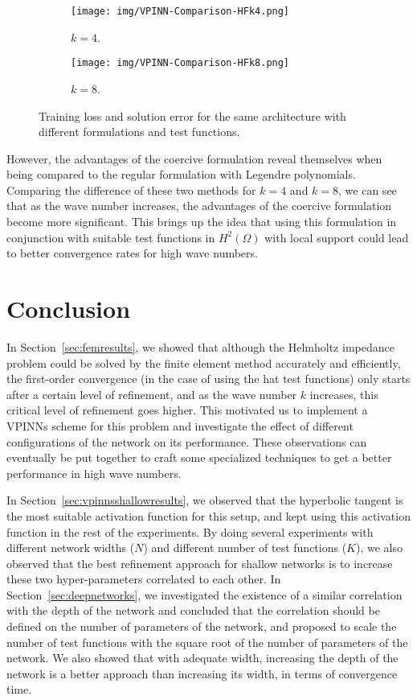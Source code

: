 \begin{figure}[h!]
    \centering
    \begin{subfigure}[b]{0.48\textwidth}
        \texttt{[image: img/VPINN-Comparison-HFk4.png]}
        \caption{$k=4$.}
        \label{fig:coercivek4}
    \end{subfigure}
    \hfill
    \begin{subfigure}[b]{0.48\textwidth}
        \texttt{[image: img/VPINN-Comparison-HFk8.png]}
        \caption{$k=8$.}
        \label{fig:coercivek8}
    \end{subfigure}
    \caption{Training loss and solution error for the same architecture with different formulations and test functions.}
    \label{fig:coercive}
\end{figure}

However, the advantages of the coercive formulation reveal themselves when being compared to the regular formulation with Legendre polynomials. Comparing the difference of these two methods for $k=4$ and $k=8$, we can see that as the wave number increases, the advantages of the coercive formulation become more significant. This brings up the idea that using this formulation in conjunction with suitable test functions in $H^2(\Omega)$ with local support could lead to better convergence rates for high wave numbers.

\section{Conclusion}\label{sec:conclusion}
In Section~\ref{sec:femresults}, we showed that although the Helmholtz impedance problem could be solved by the finite element method accurately and efficiently, the first-order convergence (in the case of using the hat test functions) only starts after a certain level of refinement, and as the wave number $k$ increases, this critical level of refinement goes higher. This motivated us to implement a VPINNs scheme for this problem and investigate the effect of different configurations of the network on its performance. These observations can eventually be put together to craft some specialized techniques to get a better performance in high wave numbers.

In Section~\ref{sec:vpinnsshallowresults}, we observed that the hyperbolic tangent is the most suitable activation function for this setup, and kept using this activation function in the rest of the experiments. By doing several experiments with different network widths ($N$) and different number of test functions ($K$), we also observed that the best refinement approach for shallow networks is to increase these two hyper-parameters correlated to each other. In Section~\ref{sec:deepnetworks}, we investigated the existence of a similar correlation with the depth of the network and concluded that the correlation should be defined on the number of parameters of the network, and proposed to scale the number of test functions with the square root of the number of parameters of the network. We also showed that with adequate width, increasing the depth of the network is a better approach than increasing its width, in terms of convergence time.

